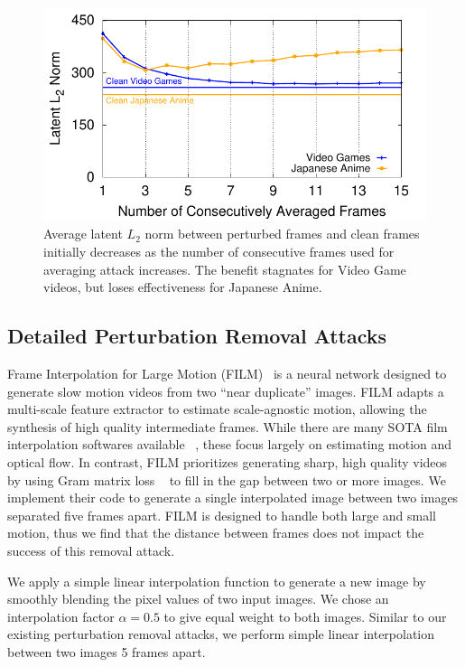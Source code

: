 \begin{figure}[t]
\begin{minipage}[t]{0.32\textwidth}
  \centering
  \includegraphics[width=0.9\columnwidth]{plots/avg-tests/avg-l2-eps-converted-to.pdf}
  \vspace{-0.1in}
  \caption{Average latent $L_2$ norm between perturbed frames and clean frames initially decreases as the number of consecutive frames used for averaging attack increases. The benefit stagnates for Video Game videos, but loses effectiveness for Japanese Anime.}
  \label{fig:l2norm-caf}
  \end{minipage}
    \hfill
\end{figure}

\subsection{Detailed Perturbation Removal Attacks}
\label{app:detailed-perturbation-removal}

Frame Interpolation for Large Motion (FILM)~\cite{reda2022film} is a neural network designed to generate slow motion videos from two ``near duplicate'' images. FILM adapts a multi-scale feature extractor to estimate scale-agnostic motion, allowing the synthesis of high quality intermediate frames. While there are many SOTA film interpolation softwares available ~\cite{niklaus2020softmax, bao2019depth, huang2022real}, these focus largely on estimating motion and optical flow. In contrast, FILM prioritizes generating sharp, high quality videos by using Gram matrix loss ~\cite{gatys2016image} to fill in the gap between two or more images. We implement their code to generate a single interpolated image between two images separated five frames apart. FILM is designed to handle both large and small motion, thus we find that the distance between frames does not impact the success of this removal attack.

We apply a simple linear interpolation function to generate a new image by smoothly blending the pixel values of two input images. We chose an interpolation factor $\alpha = 0.5$ to give equal weight to both images. Similar to our existing perturbation removal attacks, we perform simple linear interpolation between two images 5 frames apart. 

